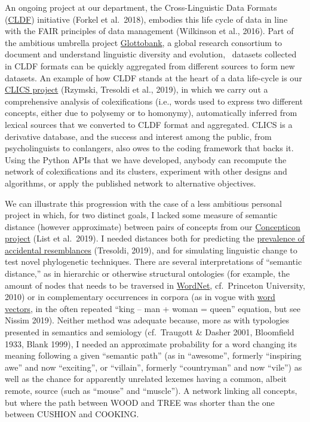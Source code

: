 \documentclass[
  a4paper,
  14pt,
  oneside,
  tablecaptionabove
]{scrbook}
\begin{document}
An ongoing project at our department, the Cross-Linguistic Data Formats
(\href{https://cldf.clld.org}{CLDF}) initiative (Forkel et al.~2018),
embodies this life cycle of data in line with the FAIR principles of
data management (Wilkinson et al., 2016). Part of the ambitious umbrella
project \href{https://glottobank.org/}{Glottobank}, a global research
consortium to document and understand linguistic diversity and
evolution,~ datasets collected in CLDF formats can be quickly aggregated
from different sources to form new datasets. An example of how CLDF
stands at the heart of a data life-cycle is our
\href{https://matthew.clld.org/clics/}{CLICS project} (Rzymski, Tresoldi
et al., 2019), in which we carry out a comprehensive analysis of
colexifications (i.e., words used to express two different concepts,
either due to polysemy or to homonymy), automatically inferred from
lexical sources that we converted to CLDF format and aggregated. CLICS
is a derivative database, and the success and interest among the public,
from psycholinguists to conlangers, also owes to the coding framework
that backs it. Using the Python APIs that we have developed, anybody can
recompute the network of colexifications and its clusters, experiment
with other designs and algorithms, or apply the published network to
alternative objectives.

We can illustrate this progression with the case of a less ambitious
personal project in which, for two distinct goals, I lacked some measure
of semantic distance (however approximate) between pairs of concepts
from our \href{https://concepticon.clld.org/}{Concepticon project} (List
et al.~2019). I needed distances both for predicting the
\href{https://speakerdeck.com/tresoldi/a-cross-linguistic-computational-approach-on-chance-resemblances}{prevalence
of accidental resemblances} (Tresoldi, 2019), and for simulating
linguistic change to test novel phylogenetic techniques. There are
several interpretations of \enquote{semantic distance,} as in hierarchic
or otherwise structural ontologies (for example, the amount of nodes
that needs to be traversed in
\href{https://wordnet.princeton.edu/}{WordNet}, cf.~Princeton
University, 2010) or in complementary occurrences in corpora (as in
vogue with \href{https://en.wikipedia.org/wiki/Word_embedding}{word
vectors}, in the often repeated \enquote{king -- man + woman = queen}
equation, but see Nissim 2019). Neither method was adequate because,
more as with typologies presented in semantics and semiology
(cf.~Traugott \& Dasher 2001, Bloomfield 1933, Blank 1999), I needed an
approximate probability for a word changing its meaning following a
given \enquote{semantic path} (as in \enquote{awesome}, formerly
\enquote{inspiring awe} and now \enquote{exciting}, or
\enquote{villain}, formerly \enquote{countryman} and now \enquote{vile})
as well as the chance for apparently unrelated lexemes having a common,
albeit remote, source (such as \enquote{mouse} and \enquote{muscle}). A
network linking all concepts, but where the path between WOOD and TREE
was shorter than the one between CUSHION and COOKING.
\end{document}

